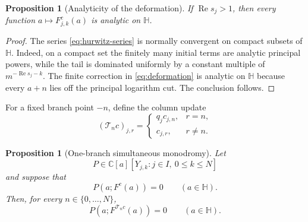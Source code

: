 \documentclass[11pt,reqno]{amsart}
\newtheorem{proposition}[theorem]{Proposition}
\theoremstyle{definition}
\theoremstyle{remark}
\newcommand{\C}{\mathbb C}
\newcommand{\HH}{\mathbb H}
\begin{document}
\begin{proposition}[Analyticity of the deformation]\label{prop:analyticity}
If $\operatorname{Re}s_j>1$, then every function
$a\mapsto F_{j,k}^{c}(a)$ is analytic on $\HH$.
\end{proposition}

\begin{proof}
The series \eqref{eq:hurwitz-series} is normally convergent on compact
subsets of $\HH$.  Indeed, on a compact set the finitely many initial terms
are analytic principal powers, while the tail is dominated uniformly by a
constant multiple of $m^{-\operatorname{Re}s_j-k}$.  The finite correction
in \eqref{eq:deformation} is analytic on $\HH$ because every $a+n$ lies off
the principal logarithm cut.  The conclusion follows.
\end{proof}

For a fixed branch point $-n$, define the column update
\begin{equation}\label{eq:column-update}
  (\mathcal T_n c)_{j,r}=
  \begin{cases}
    q_jc_{j,n},&r=n,\\
    c_{j,r},&r\neq n.
  \end{cases}
\end{equation}

\begin{proposition}[One-branch simultaneous monodromy]
\label{prop:one-branch}
Let
\[
  P\in\C[a][Y_{j,k}:j\in I,\ 0\leq k\leq N]
\]
and suppose that
\begin{equation}\label{eq:deformed-relation}
  P(a;F^c(a))=0\qquad(a\in\HH).
\end{equation}
Then, for every $n\in\{0,\ldots,N\}$,
\begin{equation}\label{eq:moved-relation}
  P(a;F^{\mathcal T_n c}(a))=0\qquad(a\in\HH).
\end{equation}
\end{proposition}
\end{document}
